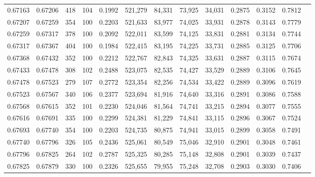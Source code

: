 \begin{tabular}{rrrrrrrrrrrrr}
0.67163 & 0.67206 &   418 & 104 &                                     0.1992 & 521,279 &  84,331 &  73,925 &  34,031 & 0.2875 & 0.3152 & 0.7812 \\
0.67207 & 0.67259 &   354 & 100 &                                     0.2203 & 521,633 &  83,977 &  74,025 &  33,931 & 0.2878 & 0.3143 & 0.7779 \\
0.67259 & 0.67317 &   378 & 100 &                                     0.2092 & 522,011 &  83,599 &  74,125 &  33,831 & 0.2881 & 0.3134 & 0.7744 \\
0.67317 & 0.67367 &   404 & 100 &                                     0.1984 & 522,415 &  83,195 &  74,225 &  33,731 & 0.2885 & 0.3125 & 0.7706 \\
0.67368 & 0.67432 &   352 & 100 &                                     0.2212 & 522,767 &  82,843 &  74,325 &  33,631 & 0.2887 & 0.3115 & 0.7674 \\
0.67433 & 0.67478 &   308 & 102 &                                     0.2488 & 523,075 &  82,535 &  74,427 &  33,529 & 0.2889 & 0.3106 & 0.7645 \\
0.67478 & 0.67523 &   279 & 107 &                                     0.2772 & 523,354 &  82,256 &  74,534 &  33,422 & 0.2889 & 0.3096 & 0.7619 \\
0.67523 & 0.67567 &   340 & 106 &                                     0.2377 & 523,694 &  81,916 &  74,640 &  33,316 & 0.2891 & 0.3086 & 0.7588 \\
0.67568 & 0.67615 &   352 & 101 &                                     0.2230 & 524,046 &  81,564 &  74,741 &  33,215 & 0.2894 & 0.3077 & 0.7555 \\
0.67616 & 0.67691 &   335 & 100 &                                     0.2299 & 524,381 &  81,229 &  74,841 &  33,115 & 0.2896 & 0.3067 & 0.7524 \\
0.67693 & 0.67740 &   354 & 100 &                                     0.2203 & 524,735 &  80,875 &  74,941 &  33,015 & 0.2899 & 0.3058 & 0.7491 \\
0.67740 & 0.67796 &   326 & 105 &                                     0.2436 & 525,061 &  80,549 &  75,046 &  32,910 & 0.2901 & 0.3048 & 0.7461 \\
0.67796 & 0.67825 &   264 & 102 &                                     0.2787 & 525,325 &  80,285 &  75,148 &  32,808 & 0.2901 & 0.3039 & 0.7437 \\
0.67825 & 0.67879 &   330 & 100 &                                     0.2326 & 525,655 &  79,955 &  75,248 &  32,708 & 0.2903 & 0.3030 & 0.7406 \\

\end{tabular}
